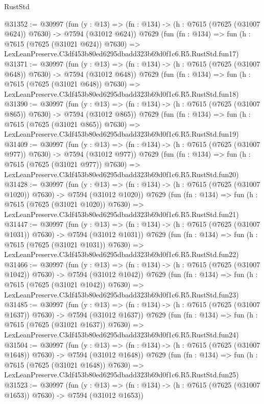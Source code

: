 \begin{lexlean}{RustStd}
\begin{coremodule}
@31352 := @30997
    (fun (y : @13) => (fn : @134) -> (h : @7615 (@7625 (@31007 @624)) @7630) -> @7594 (@31012 @624))
    @7629
    (fun (fn : @134) =>
    fun (h : @7615 (@7625 (@31021 @624)) @7630) =>
    LexLeanPreserve.C3df453b80ed6295dbadd323b69d0f1c6.R5.RustStd.fun17)
@31371 := @30997
    (fun (y : @13) => (fn : @134) -> (h : @7615 (@7625 (@31007 @648)) @7630) -> @7594 (@31012 @648))
    @7629
    (fun (fn : @134) =>
    fun (h : @7615 (@7625 (@31021 @648)) @7630) =>
    LexLeanPreserve.C3df453b80ed6295dbadd323b69d0f1c6.R5.RustStd.fun18)
@31390 := @30997
    (fun (y : @13) => (fn : @134) -> (h : @7615 (@7625 (@31007 @865)) @7630) -> @7594 (@31012 @865))
    @7629
    (fun (fn : @134) =>
    fun (h : @7615 (@7625 (@31021 @865)) @7630) =>
    LexLeanPreserve.C3df453b80ed6295dbadd323b69d0f1c6.R5.RustStd.fun19)
@31409 := @30997
    (fun (y : @13) => (fn : @134) -> (h : @7615 (@7625 (@31007 @977)) @7630) -> @7594 (@31012 @977))
    @7629
    (fun (fn : @134) =>
    fun (h : @7615 (@7625 (@31021 @977)) @7630) =>
    LexLeanPreserve.C3df453b80ed6295dbadd323b69d0f1c6.R5.RustStd.fun20)
@31428 := @30997
    (fun (y : @13) =>
    (fn : @134) -> (h : @7615 (@7625 (@31007 @1020)) @7630) -> @7594 (@31012 @1020))
    @7629
    (fun (fn : @134) =>
    fun (h : @7615 (@7625 (@31021 @1020)) @7630) =>
    LexLeanPreserve.C3df453b80ed6295dbadd323b69d0f1c6.R5.RustStd.fun21)
@31447 := @30997
    (fun (y : @13) =>
    (fn : @134) -> (h : @7615 (@7625 (@31007 @1031)) @7630) -> @7594 (@31012 @1031))
    @7629
    (fun (fn : @134) =>
    fun (h : @7615 (@7625 (@31021 @1031)) @7630) =>
    LexLeanPreserve.C3df453b80ed6295dbadd323b69d0f1c6.R5.RustStd.fun22)
@31466 := @30997
    (fun (y : @13) =>
    (fn : @134) -> (h : @7615 (@7625 (@31007 @1042)) @7630) -> @7594 (@31012 @1042))
    @7629
    (fun (fn : @134) =>
    fun (h : @7615 (@7625 (@31021 @1042)) @7630) =>
    LexLeanPreserve.C3df453b80ed6295dbadd323b69d0f1c6.R5.RustStd.fun23)
@31485 := @30997
    (fun (y : @13) =>
    (fn : @134) -> (h : @7615 (@7625 (@31007 @1637)) @7630) -> @7594 (@31012 @1637))
    @7629
    (fun (fn : @134) =>
    fun (h : @7615 (@7625 (@31021 @1637)) @7630) =>
    LexLeanPreserve.C3df453b80ed6295dbadd323b69d0f1c6.R5.RustStd.fun24)
@31504 := @30997
    (fun (y : @13) =>
    (fn : @134) -> (h : @7615 (@7625 (@31007 @1648)) @7630) -> @7594 (@31012 @1648))
    @7629
    (fun (fn : @134) =>
    fun (h : @7615 (@7625 (@31021 @1648)) @7630) =>
    LexLeanPreserve.C3df453b80ed6295dbadd323b69d0f1c6.R5.RustStd.fun25)
@31523 := @30997
    (fun (y : @13) =>
    (fn : @134) -> (h : @7615 (@7625 (@31007 @1653)) @7630) -> @7594 (@31012 @1653))

\end{coremodule}
\end{lexlean}
